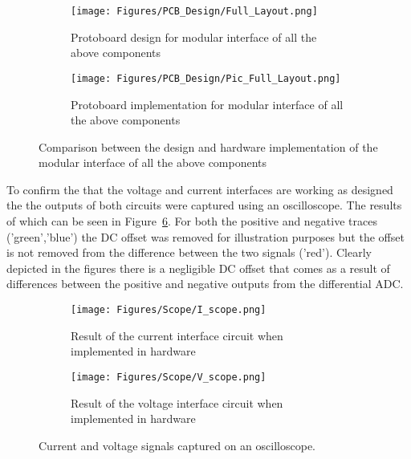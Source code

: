 \begin{figure}[H]
     \centering
     \begin{subfigure}[b]{0.495\textwidth}
        \centering
        \texttt{[image: Figures/PCB\_Design/Full\_Layout.png]}
        \caption{Protoboard design for modular interface of all the above components}
        \label{fig:FUll_hardware_Design}
     \end{subfigure}
     \hfill
     \begin{subfigure}[b]{0.495\textwidth}
        \centering
        \texttt{[image: Figures/PCB\_Design/Pic\_Full\_Layout.png]}
        \caption{Protoboard implementation for modular interface of all the above components}
        \label{fig:FULL_hardware_Implementation}
     \end{subfigure}
        \caption{Comparison between the design and hardware implementation of the modular interface of all the above components}
        \label{fig:Full_hardware_Comparison}
\end{figure}

To confirm the that the voltage and current interfaces are working as designed the the outputs of both circuits were captured using an oscilloscope. The results of which can be seen in Figure~\ref{fig:Full_hardware_Scope}. For both the positive and negative traces ('green','blue') the DC offset was removed for illustration purposes but the offset is not removed from the difference between the two signals ('red'). Clearly depicted in the figures there is a negligible DC offset that comes as a result of differences between the positive and negative outputs from the differential ADC.    
\begin{figure}[H]
     \centering
     \begin{subfigure}[b]{0.495\textwidth}
        \centering
        \texttt{[image: Figures/Scope/I\_scope.png]}
        \caption{Result of the current interface circuit when implemented in hardware}
        \label{fig:Current_Signal_Scope}
     \end{subfigure}
     \hfill
     \begin{subfigure}[b]{0.495\textwidth}
        \centering
        \texttt{[image: Figures/Scope/V\_scope.png]}
        \caption{Result of the voltage interface circuit when implemented in hardware}
        \label{fig:Voltage_Signal_Scope}
     \end{subfigure}
        \caption{Current and voltage signals captured on an oscilloscope.}
        \label{fig:Full_hardware_Scope}
\end{figure}


